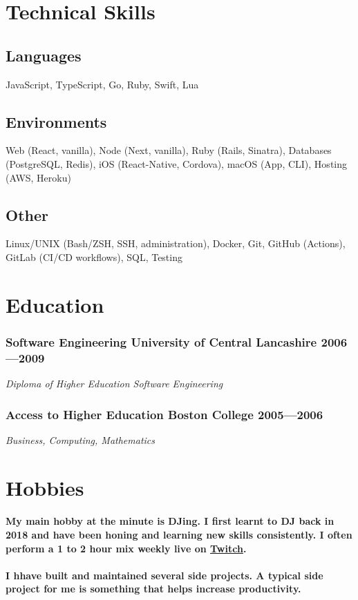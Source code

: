 \documentclass[a4paper]{article}
\newcommand{\datedsubsection}[2]{
  \subsubsection{#1 \hfill \textbf{#2}}
}
\begin{document}
\section{Technical Skills}

\subsection{Languages} JavaScript, TypeScript, Go, Ruby, Swift, Lua

\subsection{Environments} Web (React, vanilla), Node (Next, vanilla), Ruby (Rails, Sinatra), Databases (PostgreSQL, Redis), iOS (React-Native, Cordova), macOS (App, CLI), Hosting (AWS, Heroku)

\subsection{Other}Linux/UNIX (Bash/ZSH, SSH, administration), Docker, Git, GitHub (Actions), GitLab (CI/CD workflows), SQL, Testing

\clearpage

\section{Education}

\datedsubsection{\textbf{Software Engineering} University of Central Lancashire}{2006---2009}
\textit{Diploma of Higher Education Software Engineering}

\datedsubsection{\textbf{Access to Higher Education} Boston College}{2005---2006}
\textit{Business, Computing, Mathematics}

\section{Hobbies}
\paragraph{My main hobby at the minute is DJing. I first learnt to DJ back in 2018 and have been honing and learning new skills consistently. I often perform a 1 to 2 hour mix weekly live on \href{https://twitch.tv/iamdjriff}{Twitch}.}

\paragraph{I hhave built and maintained several side projects. A typical side project for me is something that helps increase productivity.}
\end{document}
